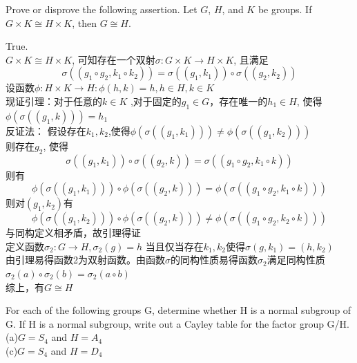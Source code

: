 \documentclass[a4paper, justified]{tufte-handout}
\begin{document}
\begin{problem}[TJ 9-23]
Prove or disprove the following assertion. Let $G$, $H$, and $K$ be groups. If $G \times K \cong H  \times K$, then $G \cong H$.
\end{problem}

\begin{solution}
True.\\
$G \times K \cong H  \times K$, 可知存在一个双射$\sigma: G\times K \to H\times K$, 且满足
\[
\sigma((g_1\circ g_2,k_1 \circ k_2))=\sigma((g_1,k_1))\circ\sigma((g_2,k_2))
\]
设函数$\phi: H\times K \to H : \phi(h,k)=h, h\in H,k\in K$\\
现证引理：对于任意的$k\in K$ ,对于固定的$g_1\in G$，存在唯一的$h_1\in H$, 使得$\phi(\sigma((g_1, k)))=h_1$\\
反证法： 假设存在$k_1,k_2$,使得$\phi(\sigma((g_1, k_1)))\neq \phi(\sigma((g_1, k_2)))$\\
则存在$g_2$, 使得
\[
\sigma((g_1,k_1))\circ\sigma((g_2, k))=\sigma((g_1\circ g_2,k_1\circ k))
\]
则有
\[
\phi(\sigma((g_1,k_1)))\circ\phi(\sigma((g_2, k)))=\phi(\sigma((g_1\circ g_2,k_1\circ k)))
\]
则对$(g_1,k_2)$有
\[
\phi(\sigma((g_1,k_2)))\circ\phi(\sigma((g_2, k)))\neq \phi(\sigma((g_1\circ g_2,k_2\circ k)))
\]
与同构定义相矛盾，故引理得证\\
定义函数$\sigma_2: G \to H, \sigma_2(g)=h$ 当且仅当存在$k_1,k_2$使得$\sigma(g,k_1)=(h,k_2)$\\
由引理易得函数2为双射函数。由函数$\sigma$的同构性质易得函数$\sigma_2$满足同构性质$\sigma_2(a)\circ\sigma_2(b)=\sigma_2(a\circ b)$\\
综上，有$G\cong H$
\end{solution}

\begin{problem}[TJ 10-1(a,c)]
For each of the following groups G, determine whether H is a normal subgroup of G. If H is a normal subgroup, write out a Cayley table for the factor group G/H.\\
(a)$G=S_4$ and $H=A_4$\\
(c)$G=S_4$ and $H=D_4$
\end{problem}
\end{document}
